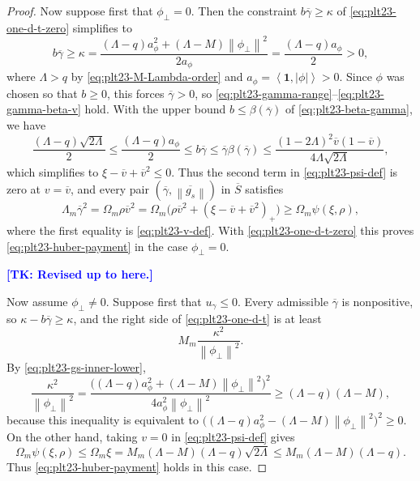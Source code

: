 \documentclass[11pt]{article}
\numberwithin{equation}{section}
\newcommand{\one}{\mathbf 1}
\newcommand{\ip}[2]{\left\langle #1,#2\right\rangle}
\newcommand{\norm}[1]{\left\lVert #1\right\rVert}
\newcommand{\pos}[1]{\left(#1\right)_{+}}
\newcommand*{\tk}[1]{\textcolor{blue}{\textbf{[TK: #1]}}}
\begin{document}
\begin{proof}
  Now suppose first that $\phi_\perp=0$.  Then the constraint
  $b\overline\gamma\ge\kappa$ of \eqref{eq:plt23-one-d-t-zero} simplifies to
  \[
    b\overline\gamma\ge\kappa
    =\frac{(\Lambda-q)a_\phi^2+(\Lambda-M)\norm{\phi_\perp}^2}{2a_\phi}
    =\frac{(\Lambda-q)a_\phi}{2}>0,
  \]
  where $\Lambda>q$ by \eqref{eq:plt23-M-Lambda-order} and
  $a_\phi=\ip\one{|\phi|}>0$.  Since $\phi$ was chosen so that $b\ge0$, this
  forces $\overline\gamma>0$, so
  \eqref{eq:plt23-gamma-range}--\eqref{eq:plt23-gamma-beta-v} hold.  With
  the upper bound $b\le\beta(\overline\gamma)$ of \eqref{eq:plt23-beta-gamma}, we have
  \[
    \frac{(\Lambda-q)\sqrt{2\Lambda}}{2}
    \le\frac{(\Lambda-q)a_\phi}{2}
    \le b\overline\gamma
    \le\overline\gamma\beta(\overline\gamma)
    \le\frac{(1-2\Lambda)^2\overline v(1-\overline v)}{4\Lambda\sqrt{2\Lambda}},
  \]
  which simplifies to $\xi-\overline v+\overline v^2\le0$.  Thus the second
  term in \eqref{eq:plt23-psi-def} is zero at $v=\overline v$, and every pair $(\overline\gamma,\overline{\norm{g_s}})$ in $\overline S$ satisfies
  \[
    \Lambda_m\overline\gamma^2
    =\Omega_m\rho\overline v^2
    =\Omega_m\bigl(\rho\overline v^2+\pos{\xi-\overline v+\overline v^2}\bigr)
    \ge \Omega_m\psi(\xi,\rho),
  \]
  where the first equality is \eqref{eq:plt23-v-def}.  With
  \eqref{eq:plt23-one-d-t-zero} this proves
  \eqref{eq:plt23-huber-payment} in the case $\phi_\perp=0$.

  \tk{Revised up to here.}

  Now assume $\phi_\perp\ne0$.  Suppose first that $u_\gamma\le0$.  Every
  admissible $\overline\gamma$ is nonpositive, so
  $\kappa-b\overline\gamma\ge\kappa$, and the right
  side of \eqref{eq:plt23-one-d-t} is at least
  \[
    M_m\frac{\kappa^2}{\norm{\phi_\perp}^2}.
  \]
  By \eqref{eq:plt23-gs-inner-lower},
  \[
    \frac{\kappa^2}{\norm{\phi_\perp}^2}
    =\frac{\bigl((\Lambda-q)a_\phi^2+(\Lambda-M)\norm{\phi_\perp}^2\bigr)^2}
    {4a_\phi^2\norm{\phi_\perp}^2}\ge(\Lambda-q)(\Lambda-M),
  \]
  because this inequality is equivalent to
  $\bigl((\Lambda-q)a_\phi^2-(\Lambda-M)\norm{\phi_\perp}^2\bigr)^2\ge0$.  On
  the other hand, taking $v=0$ in \eqref{eq:plt23-psi-def} gives
  \[
    \Omega_m\psi(\xi,\rho)
    \le \Omega_m\xi=M_m(\Lambda-M)(\Lambda-q)\sqrt{2\Lambda}
    \le M_m(\Lambda-M)(\Lambda-q).
  \]
  Thus \eqref{eq:plt23-huber-payment} holds in this case.


\end{proof}
\end{document}
